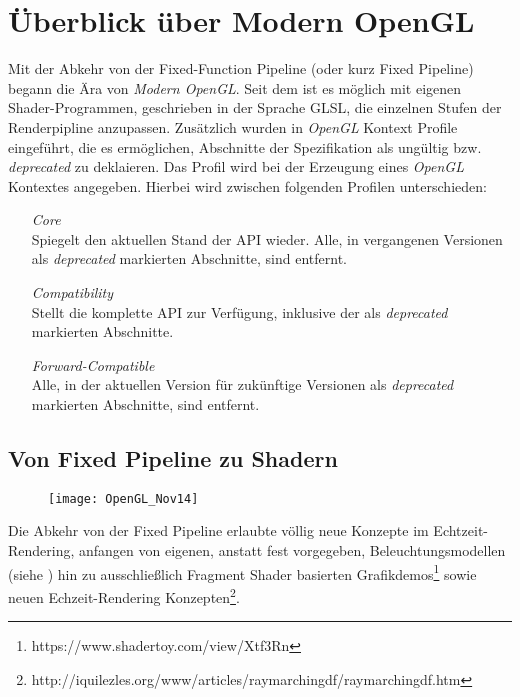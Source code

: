 \chapter{Überblick über Modern OpenGL}
\label{chap:modern-opengl}

Mit der Abkehr von der Fixed-Function Pipeline (oder kurz Fixed Pipeline) begann die Ära von \textit{Modern OpenGL}. Seit dem ist es möglich mit eigenen Shader-Programmen, geschrieben in der Sprache GLSL, die einzelnen Stufen der Renderpipline anzupassen. Zusätzlich wurden in \textit{OpenGL} Kontext Profile eingeführt, die es ermöglichen, Abschnitte der Spezifikation als ungültig bzw. \textit{deprecated} zu deklaieren. Das Profil wird bei der Erzeugung eines \textit{OpenGL} Kontextes angegeben. Hierbei wird zwischen folgenden Profilen unterschieden:

\begin{enumerate}[leftmargin=3.5cm]
\item[\textit{Core}] \hfill \\
	Spiegelt den aktuellen Stand der \ac{API} wieder. Alle, in vergangenen Versionen als \textit{deprecated} markierten Abschnitte, sind entfernt.
\item[\textit{Compatibility}] \hfill \\
	Stellt die komplette \ac{API} zur Verfügung, inklusive der als \textit{deprecated} markierten Abschnitte. 
\item[\textit{Forward-Compatible}] \hfill \\
	Alle, in der aktuellen Version für zukünftige Versionen als \textit{deprecated} markierten Abschnitte, sind entfernt.
\end{enumerate}

\section{Von Fixed Pipeline zu Shadern}

\begin{wrapfigure}{r}{0.4\linewidth}
\begin{centering}
	\texttt{[image: OpenGL\_Nov14]}
\end{centering}
\end{wrapfigure}

Die Abkehr von der Fixed Pipeline erlaubte völlig neue Konzepte im Echtzeit-Rendering, anfangen von eigenen, anstatt fest vorgegeben, Beleuchtungsmodellen (siehe ) hin zu ausschließlich Fragment Shader basierten Grafikdemos\footnote{https://www.shadertoy.com/view/Xtf3Rn} sowie neuen Echzeit-Rendering Konzepten\footnote{http://iquilezles.org/www/articles/raymarchingdf/raymarchingdf.htm}.

